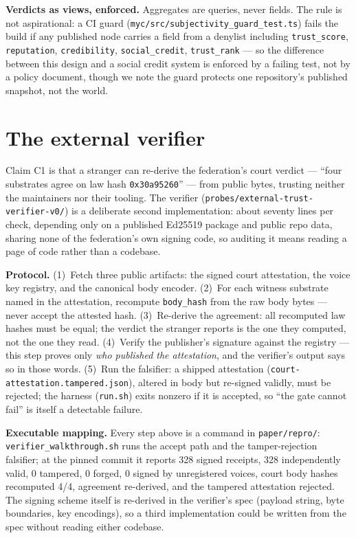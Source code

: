 \documentclass[10pt]{article}
\newcommand{\code}[1]{\texttt{\small #1}}
\newcommand{\repopath}[1]{\texttt{\small #1}}
\begin{document}
\textbf{Verdicts as views, enforced.} Aggregates are queries, never fields.
The rule is not aspirational: a CI guard
(\repopath{myc/src/subjectivity\_guard\_test.ts}) fails the build if any
published node carries a field from a denylist including
\code{trust\_score}, \code{reputation}, \code{credibility},
\code{social\_credit}, \code{trust\_rank} --- so the difference between this
design and a social credit system is enforced by a failing test, not by a
policy document, though we note the guard protects one repository's
published snapshot, not the world.

\section{The external verifier}
\label{sec:verifier}
\label{sec:repro-map}

Claim C1 is that a stranger can re-derive the federation's court verdict ---
``four substrates agree on law hash \code{0x30a95260}'' --- from public
bytes, trusting neither the maintainers nor their tooling. The verifier
(\repopath{probes/external-trust-verifier-v0/}) is a deliberate second
implementation: about seventy lines per check, depending only on a published
Ed25519 package and public repo data, sharing none of the federation's own
signing code, so auditing it means reading a page of code rather than a
codebase.

\textbf{Protocol.} (1)~Fetch three public artifacts: the signed court
attestation, the voice key registry, and the canonical body encoder.
(2)~For each witness substrate named in the attestation, recompute
\code{body\_hash} from the raw body bytes --- never accept the attested
hash. (3)~Re-derive the agreement: all recomputed law hashes must be equal;
the verdict the stranger reports is the one they computed, not the one they
read. (4)~Verify the publisher's signature against the registry --- this
step proves only \emph{who published the attestation}, and the verifier's
output says so in those words. (5)~Run the falsifier: a shipped attestation
(\repopath{court-attestation.tampered.json}), altered in body but re-signed
validly, must be rejected; the harness (\repopath{run.sh}) exits nonzero if
it is accepted, so ``the gate cannot fail'' is itself a detectable failure.

\textbf{Executable mapping.} Every step above is a command in
\repopath{paper/repro/}: \repopath{verifier\_walkthrough.sh} runs the accept
path and the tamper-rejection falsifier; at the pinned commit it reports 328
signed receipts, 328 independently valid, 0 tampered, 0 forged, 0 signed by
unregistered voices, court body hashes recomputed 4/4, agreement re-derived,
and the tampered attestation rejected. The signing scheme itself is
re-derived in the verifier's spec (payload string, byte boundaries, key
encodings), so a third implementation could be written from the spec without
reading either codebase.
\end{document}
